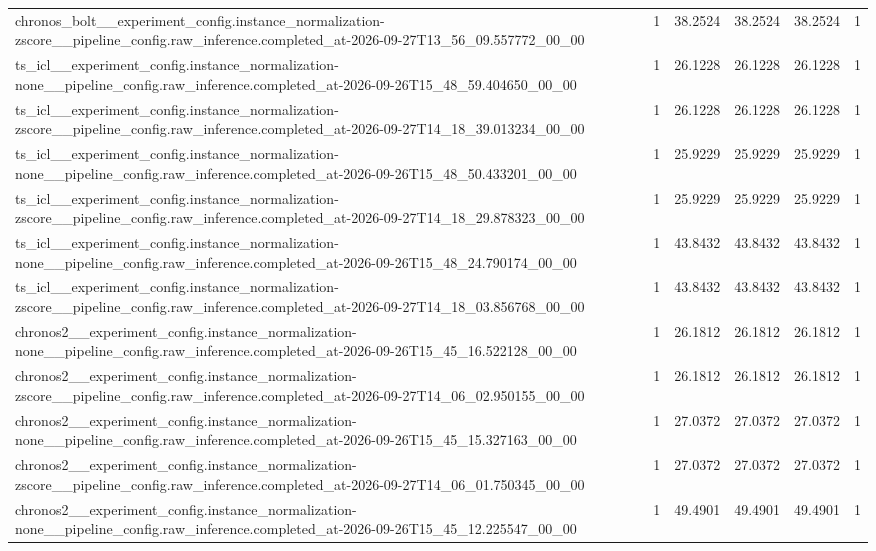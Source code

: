 \begin{tabular}{llllll}
chronos\_bolt\_\_experiment\_config.instance\_normalization-zscore\_\_pipeline\_config.raw\_inference.completed\_at-2026-09-27T13\_56\_09.557772\_00\_00 & 1 & 38.2524 & 38.2524 & 38.2524 & 1 \\
ts\_icl\_\_experiment\_config.instance\_normalization-none\_\_pipeline\_config.raw\_inference.completed\_at-2026-09-26T15\_48\_59.404650\_00\_00 & 1 & 26.1228 & 26.1228 & 26.1228 & 1 \\
ts\_icl\_\_experiment\_config.instance\_normalization-zscore\_\_pipeline\_config.raw\_inference.completed\_at-2026-09-27T14\_18\_39.013234\_00\_00 & 1 & 26.1228 & 26.1228 & 26.1228 & 1 \\
ts\_icl\_\_experiment\_config.instance\_normalization-none\_\_pipeline\_config.raw\_inference.completed\_at-2026-09-26T15\_48\_50.433201\_00\_00 & 1 & 25.9229 & 25.9229 & 25.9229 & 1 \\
ts\_icl\_\_experiment\_config.instance\_normalization-zscore\_\_pipeline\_config.raw\_inference.completed\_at-2026-09-27T14\_18\_29.878323\_00\_00 & 1 & 25.9229 & 25.9229 & 25.9229 & 1 \\
ts\_icl\_\_experiment\_config.instance\_normalization-none\_\_pipeline\_config.raw\_inference.completed\_at-2026-09-26T15\_48\_24.790174\_00\_00 & 1 & 43.8432 & 43.8432 & 43.8432 & 1 \\
ts\_icl\_\_experiment\_config.instance\_normalization-zscore\_\_pipeline\_config.raw\_inference.completed\_at-2026-09-27T14\_18\_03.856768\_00\_00 & 1 & 43.8432 & 43.8432 & 43.8432 & 1 \\
chronos2\_\_experiment\_config.instance\_normalization-none\_\_pipeline\_config.raw\_inference.completed\_at-2026-09-26T15\_45\_16.522128\_00\_00 & 1 & 26.1812 & 26.1812 & 26.1812 & 1 \\
chronos2\_\_experiment\_config.instance\_normalization-zscore\_\_pipeline\_config.raw\_inference.completed\_at-2026-09-27T14\_06\_02.950155\_00\_00 & 1 & 26.1812 & 26.1812 & 26.1812 & 1 \\
chronos2\_\_experiment\_config.instance\_normalization-none\_\_pipeline\_config.raw\_inference.completed\_at-2026-09-26T15\_45\_15.327163\_00\_00 & 1 & 27.0372 & 27.0372 & 27.0372 & 1 \\
chronos2\_\_experiment\_config.instance\_normalization-zscore\_\_pipeline\_config.raw\_inference.completed\_at-2026-09-27T14\_06\_01.750345\_00\_00 & 1 & 27.0372 & 27.0372 & 27.0372 & 1 \\
chronos2\_\_experiment\_config.instance\_normalization-none\_\_pipeline\_config.raw\_inference.completed\_at-2026-09-26T15\_45\_12.225547\_00\_00 & 1 & 49.4901 & 49.4901 & 49.4901 & 1 \\

\end{tabular}
